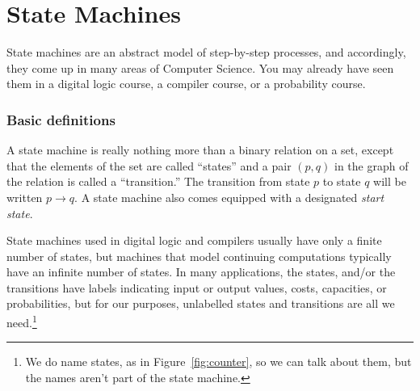 \chapter{State Machines}

\def\movesto{\mathrel{\longrightarrow}}

\def\lexle{\mathrel{\preceq_{\text{lex}}}}
\def\lex<{\mathrel{\prec_{\text{lex}}}}
\def\coordle{\mathrel{\preceq_{\text{c}}}}
\def\coord<{\mathrel{\prec_{\text{c}}}}

\providecommand{\boys}{\text{the-Boys}}
\providecommand{\girls}{\text{the-Girls}}
\providecommand{\qst}{\text{$q_0$}}
\providecommand{\none}{\texttt{none}}
\providecommand{\girln}{\text{$\girls \union \set{\none}$}}
\providecommand{\boyn}{\text{$\boys \union \set{\none}$}}
\providecommand{\sere}{\text{\emph{serenading}}}
\providecommand{\suit}{\text{\emph{suitors}}}
\providecommand{\fav}{\text{\emph{favorite}}}
\providecommand{\nex}{\text{\emph{next}}}
\providecommand{\tgn}{\text{\emph{total-girls-names}}}


State machines are an abstract model of step-by-step processes, and
accordingly, they come up in many areas of Computer Science.  You may
already have seen them in a digital logic course, a compiler course, or a
probability course.

\subsection{Basic definitions}

A state machine is really nothing more than a binary relation on a set,
except that the elements of the set are called ``states'' and a pair
$(p,q)$ in the graph of the relation is called a ``transition.''  The
transition from state $p$ to state $q$ will be written $p \movesto q$.
A state machine also comes equipped with a designated \emph{start state}.

State machines used in digital logic and compilers usually have only a
finite number of states, but machines that model continuing computations
typically have an infinite number of states.  In many applications, the
states, and/or the transitions have labels indicating input or output
values, costs, capacities, or probabilities, but for our purposes,
unlabelled states and transitions are all we need.\footnote{We do name
states, as in Figure~\ref{fig:counter}, so we can talk about them, but the
names aren't part of the state machine.}

